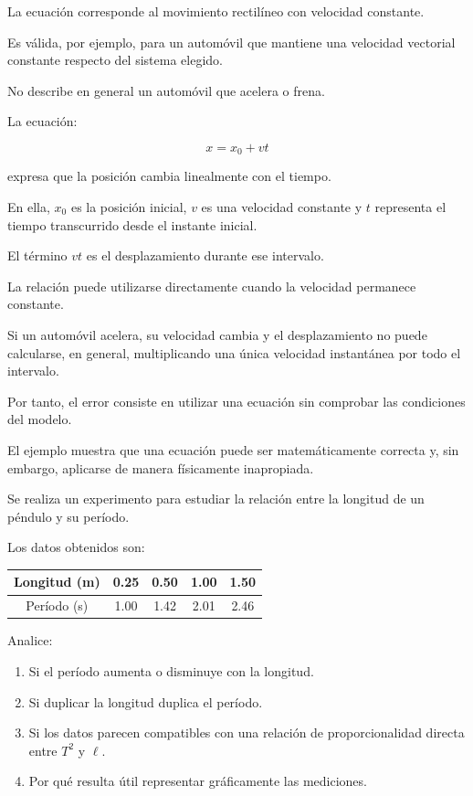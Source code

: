 \begin{respuesta}
La ecuación corresponde al movimiento rectilíneo con velocidad constante.

Es válida, por ejemplo, para un automóvil que mantiene una velocidad vectorial constante respecto del sistema elegido.

No describe en general un automóvil que acelera o frena.
\end{respuesta}

\begin{explicacion}
La ecuación:

\[x=x_0+vt\]

expresa que la posición cambia linealmente con el tiempo.

En ella, \(x_0\) es la posición inicial, \(v\) es una velocidad constante y \(t\) representa el tiempo transcurrido desde el instante inicial.

El término \(vt\) es el desplazamiento durante ese intervalo.

La relación puede utilizarse directamente cuando la velocidad permanece constante.

Si un automóvil acelera, su velocidad cambia y el desplazamiento no puede calcularse, en general, multiplicando una única velocidad instantánea por todo el intervalo.

Por tanto, el error consiste en utilizar una ecuación sin comprobar las condiciones del modelo.

El ejemplo muestra que una ecuación puede ser matemáticamente correcta y, sin embargo, aplicarse de manera físicamente inapropiada.
\end{explicacion}


\begin{ejercicio}
Se realiza un experimento para estudiar la relación entre la longitud de un péndulo y su período.

Los datos obtenidos son:

\begin{center}
\begin{tabular}{c|cccc}
\hline
Longitud (\si{\meter}) & 0.25 & 0.50 & 1.00 & 1.50 \\
\hline
Período (\si{\second}) & 1.00 & 1.42 & 2.01 & 2.46 \\
\hline
\end{tabular}
\end{center}

Analice:

\begin{enumerate}[label=\alph*)]
    \item Si el período aumenta o disminuye con la longitud.
    \item Si duplicar la longitud duplica el período.
    \item Si los datos parecen compatibles con una relación de proporcionalidad directa entre \(T^2\) y \(\ell\).
    \item Por qué resulta útil representar gráficamente las mediciones.
\end{enumerate}
\end{ejercicio}

